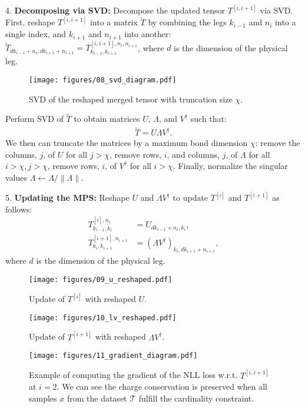 4. \textbf{Decomposing via SVD:}
   Decompose the updated tensor $T^{[i, i+1]}$ via SVD. First, reshape $T^{[i, i+1]}$ into a matrix $\tilde T$ by combining the legs $k_{i-1}$ and $n_i$ into a single index, and $k_{i+1}$ and $n_{i+1}$ into another: $\tilde T_{dk_{i-1}+n_i,dk_{i+1}+n_{i+1}}=T^{[i, i+1],n_i, n_{i+1}}_{k_{i-1}, k_{i+1}}$, where $d$ is the dimension of the physical leg.
   
   \begin{figure}[ht]
       \centering
       \texttt{[image: figures/08\_svd\_diagram.pdf]}
       \caption{SVD of the reshaped merged tensor with truncation size $\chi$.}
       \label{fig:svd_diagram}
   \end{figure}

   Perform SVD of $\tilde{T}$ to obtain matrices $U$, $\Lambda$, and $V^\dagger$ such that:
   \begin{align}
       \tilde{T} = U \Lambda V^\dagger.
   \end{align}
   We then can truncate the matrices by a maximum bond dimension $\chi$: remove the columns, $j$, of $U$ for all $j>\chi$, remove rows, $i$, and columns, $j$, of $\Lambda$ for all $i>\chi, j>\chi$, remove rows, $i$, of $V^\dagger$ for all $i>\chi$. Finally, normalize the singular values $\Lambda\leftarrow\Lambda/\|\Lambda\|$.

5. \textbf{Updating the MPS:}
    Reshape $U$ and $\Lambda V^\dagger$ to update $T^{[i]}$ and $T^{[i+1]}$ as follows:
   \begin{align}
       T^{[i], n_i}_{k_{i-1}, k_{i}} &= U_{d k_{i-1} + n_i, k_{i}}, \\
       T^{[i+1], n_{i+1}}_{k_{i}, k_{i+1}} &= \left(\Lambda V^\dagger\right)_{k_{i}, d k_{i+1} + n_{i+1}},
   \end{align}
   where $d$ is the dimension of the physical leg.
   \begin{figure}[ht]
       \centering
       \texttt{[image: figures/09\_u\_reshaped.pdf]}
       \caption{Update of $T^{[i]}$ with reshaped $U$.}
       \label{fig:u_reshaped}
   \end{figure}
   \begin{figure}[ht]
       \centering
        \texttt{[image: figures/10\_lv\_reshaped.pdf]}
       \caption{Update of $T^{[i+1]}$ with reshaped $\Lambda V^\dagger$.}
       \label{fig:lv_reshaped}
   \end{figure}

\begin{figure*}[ht]
   \centering
   \texttt{[image: figures/11\_gradient\_diagram.pdf]}
   \caption{Example of computing the gradient of the NLL loss w.r.t. $T^{[i, i+1]}$ at $i=2$. We can see the charge conservation is preserved when all samples $x$ from the dataset $\mathcal T$ fulfill the cardinality constraint.}
   \label{fig:grad_diagram}
\end{figure*}

